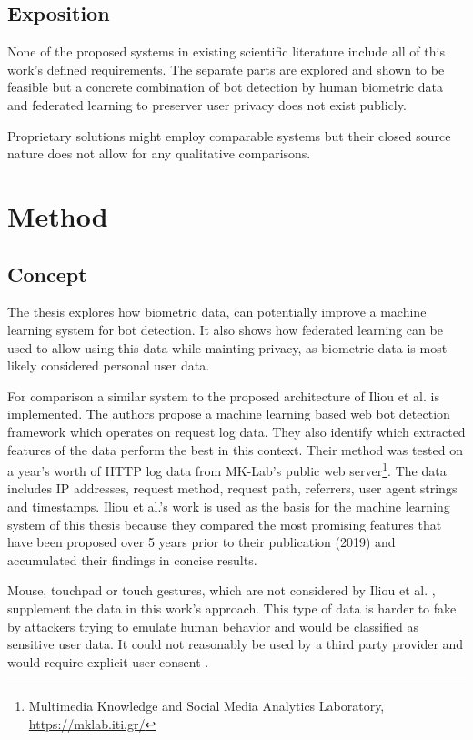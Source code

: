\documentclass[
    fontsize=12pt,
    headings=small,
    parskip=half,           %
    bibliography=totoc,
    numbers=noenddot,       %
    open=any,               %
    final                   %
]{scrreprt}
\begin{document}
\section{Exposition}

None of the proposed systems in existing scientific literature include all of this work's defined requirements. The separate parts are explored and shown to be feasible but a concrete combination of bot detection by human biometric data and federated learning to preserver user privacy does not exist publicly.

Proprietary solutions might employ comparable systems but their closed source nature does not allow for any qualitative comparisons.


\chapter{Method}

\section{Concept}

The thesis explores how biometric data, can potentially improve a machine learning system for bot detection. It also shows how federated learning can be used to allow using this data while mainting privacy, as biometric data is most likely considered personal user data.

For comparison a similar system to the proposed architecture of Iliou et al. \cite{10.1145/3339252.3339267} is implemented. The authors propose a machine learning based web bot detection framework which operates on request log data. They also identify which extracted features of the data perform the best in this context. Their method was tested on a year's worth of HTTP log data from MK-Lab's public web server\footnote{Multimedia Knowledge and Social Media Analytics Laboratory, \url{https://mklab.iti.gr/}}. The data includes IP addresses, request method, request path, referrers, user agent strings and timestamps.
Iliou et al.'s work is used as the basis for the machine learning system of this thesis because they compared the most promising features that have been proposed over 5 years prior to their publication (2019) and accumulated their findings in concise results.

Mouse, touchpad or touch gestures, which are not considered by Iliou et al. \cite{10.1145/3339252.3339267}, supplement the data in this work's approach. This type of data is harder to fake by attackers trying to emulate human behavior and would be classified as sensitive user data. It could not reasonably be used by a third party provider and would require explicit user consent \cite{GDPR}.
\end{document}
